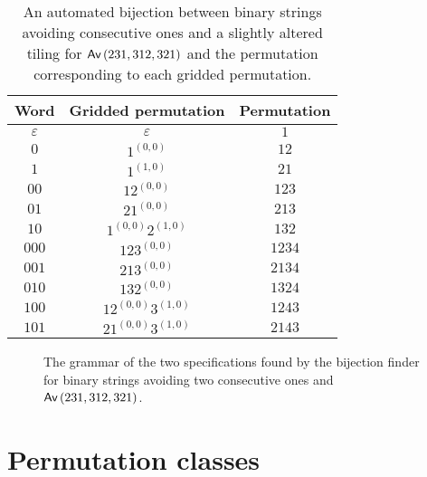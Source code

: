 \begin{table}[ht!]
    \centering
    \begin{tabular}{c|c|c}
        Word & Gridded permutation & Permutation\\
        \hline
        $\varepsilon$ & $\varepsilon$ & $1$\\
        $0$ & $1^{(0,0)}$ & $12$\\
        $1$ & $1^{(1,0)}$ & $21$\\
        $00$ & $12^{(0,0)}$ & $123$\\
        $01$ & $21^{(0,0)}$ & $213$\\
        $10$ & $1^{(0,0)}2^{(1,0)}$ & $132$\\
        $000$ & $123^{(0,0)}$ & $1234$\\
        $001$ & $213^{(0,0)}$ & $2134$\\
        $010$ & $132^{(0,0)}$ & $1324$\\
        $100$ & $12^{(0,0)}3^{(1,0)}$ & $1243$\\
        $101$ & $21^{(0,0)}3^{(1,0)}$ & $2143$\\
    \end{tabular}
    \caption{An automated bijection between binary strings avoiding consecutive ones and a slightly altered tiling for $\textsf{Av}\left(231,312,321\right)$ and the permutation corresponding to each gridded permutation.}
    \label{tab:wordtilmap}
\end{table}




\begin{figure}
    \centering
    
    \caption{The grammar of the two specifications found by the bijection finder for binary strings avoiding two consecutive ones and $\textsf{Av}\left(231,312,321\right)$.}
    \label{fig:fibwordpermtrees}
\end{figure}

\section{Permutation classes}
